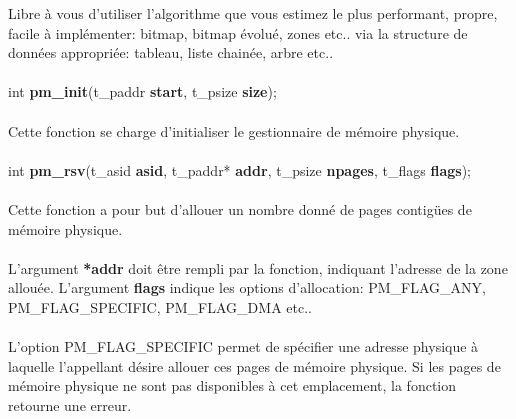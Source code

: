 \documentclass[10pt,a4wide]{article}
\begin{document}
Libre \`a vous d'utiliser l'algorithme que vous estimez le plus performant,
propre, facile \`a impl\'ementer: bitmap, bitmap \'evolu\'e, zones etc.. via
la structure de donn\'ees appropri\'ee: tableau, liste chain\'ee, arbre etc..

\paragraph{}

\hspace{1.5cm}int \textbf{pm\_init}(t\_paddr \textbf{start},
                                    t\_psize \textbf{size});

\paragraph{}

Cette fonction se charge d'initialiser le gestionnaire de m\'emoire physique.

\paragraph{}

\hspace{1.5cm}int \textbf{pm\_rsv}(t\_asid \textbf{asid},
                                   t\_paddr* \textbf{addr},
                                   t\_psize \textbf{npages},
                                   t\_flags \textbf{flags});

\paragraph{}

Cette fonction a pour but d'allouer un nombre donn\'e de pages contig\"ues
de m\'emoire physique.

\paragraph{}

L'argument \textbf{*addr} doit \^etre rempli par la fonction, indiquant
l'adresse de la zone allou\'ee. L'argument \textbf{flags} indique les options
d'allocation: PM\_FLAG\_ANY, PM\_FLAG\_SPECIFIC, PM\_FLAG\_DMA etc..

\paragraph{}

L'option PM\_FLAG\_SPECIFIC permet de sp\'ecifier une adresse physique
\`a laquelle l'appellant d\'esire allouer ces pages de m\'emoire physique.
Si les pages de m\'emoire physique ne sont pas disponibles \`a cet
emplacement, la fonction retourne une erreur.
\end{document}
